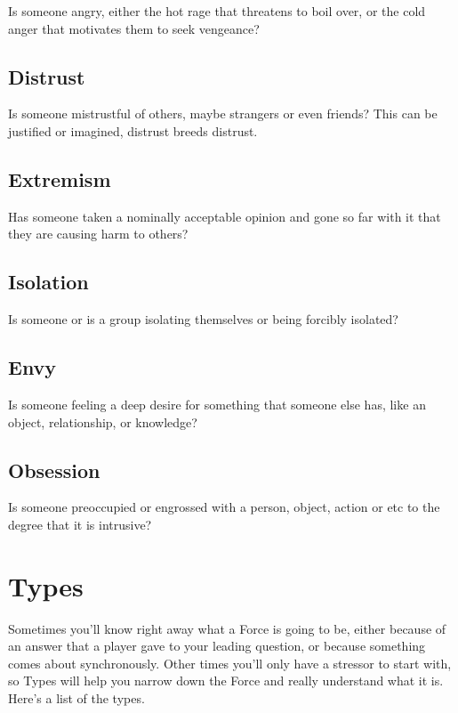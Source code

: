 \documentclass[
  oneside,
  statementpaper,
  9pt]{memoir}
\begin{document}
Is someone angry, either the hot rage that threatens to boil over, or
the cold anger that motivates them to seek vengeance?

\hypertarget{distrust}{%
\subsection{Distrust}\label{distrust}}

Is someone mistrustful of others, maybe strangers or even friends? This
can be justified or imagined, distrust breeds distrust.

\hypertarget{extremism}{%
\subsection{Extremism}\label{extremism}}

Has someone taken a nominally acceptable opinion and gone so far with it
that they are causing harm to others?

\hypertarget{isolation}{%
\subsection{Isolation}\label{isolation}}

Is someone or is a group isolating themselves or being forcibly
isolated?

\hypertarget{envy}{%
\subsection{Envy}\label{envy}}

Is someone feeling a deep desire for something that someone else has,
like an object, relationship, or knowledge?

\hypertarget{obsession}{%
\subsection{Obsession}\label{obsession}}

Is someone preoccupied or engrossed with a person, object, action or etc
to the degree that it is intrusive?

\hypertarget{types}{%
\section{Types}\label{types}}

Sometimes you'll know right away what a Force is going to be, either
because of an answer that a player gave to your leading question, or
because something comes about synchronously. Other times you'll only
have a stressor to start with, so Types will help you narrow down the
Force and really understand what it is. Here's a list of the types.
\end{document}
